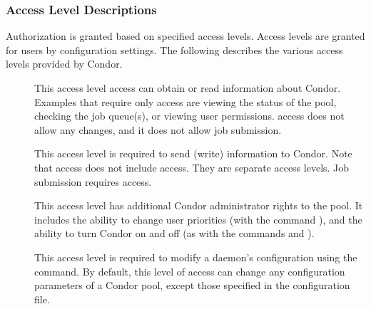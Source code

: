 \subsubsection{\label{sec:Security-access-levels} Access Level Descriptions}
Authorization is granted based on specified access levels.
Access levels are granted for users by configuration settings.
The following describes the various access levels provided
by Condor.

\begin{description}

\item[] \label{sec-level-read} This access level
   access can obtain or read information about Condor.
   Examples that require only  access are
   viewing the status of the pool, checking the job queue(s),
   or viewing user permissions.
    access does not allow any
   changes, and it does not allow job submission.

\item[] \label{sec-level-write} This access level
   is required to send (write) information to Condor.
   Note that  access does not include  access.
   They are separate access levels.
   Job submission requires  access.

\item[] \label{sec-level-administrator} This
   access level has additional Condor
   administrator rights to the pool.  It includes the ability to
   change user priorities (with the command ),
   and the ability to turn Condor on and off
   (as with the commands  and ).

\item[] \label{sec-level-config} This access level is
   required to modify a daemon's configuration using
   the  command.
   By default, this level of access can
   change any configuration parameters of a Condor pool,
   except those specified in
   the  configuration file.



\end{description}
